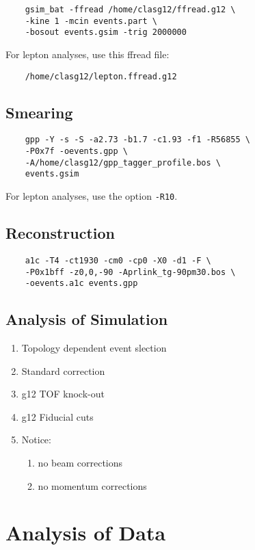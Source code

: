 \documentclass[10pt,twocolumn,oneside,letterpaper]{article}
\begin{document}
\begin{verbatim}
    gsim_bat -ffread /home/clasg12/ffread.g12 \
    -kine 1 -mcin events.part \
    -bosout events.gsim -trig 2000000
\end{verbatim}
For lepton analyses, use this ffread file:
\begin{verbatim}
    /home/clasg12/lepton.ffread.g12
\end{verbatim}

\subsection{Smearing}

\begin{verbatim}
    gpp -Y -s -S -a2.73 -b1.7 -c1.93 -f1 -R56855 \
    -P0x7f -oevents.gpp \
    -A/home/clasg12/gpp_tagger_profile.bos \
    events.gsim
\end{verbatim}
For lepton analyses, use the option \verb|-R10|.

\subsection{Reconstruction}

\begin{verbatim}
    a1c -T4 -ct1930 -cm0 -cp0 -X0 -d1 -F \
    -P0x1bff -z0,0,-90 -Aprlink_tg-90pm30.bos \
    -oevents.a1c events.gpp
\end{verbatim}

\subsection{Analysis of Simulation}

\begin{enumerate}
    \item Topology dependent event slection 
    \item Standard  correction
    \item g12 TOF knock-out
    \item g12 Fiducial cuts
    \item Notice:
    \begin{enumerate}
        \item no beam corrections
        \item no momentum corrections
    \end{enumerate}
\end{enumerate}

\section{Analysis of Data}
\end{document}
